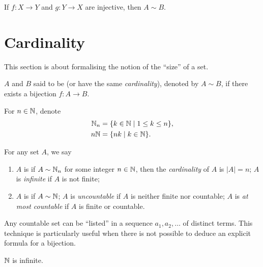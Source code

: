 \begin{theorem}
If $f:X\to Y$ and $g:Y\to X$ are injective, then $A\sim B$.
\end{theorem}
\pagebreak

\section{Cardinality}
This section is about formalising the notion of the ``size'' of a set.

\begin{definition}
$A$ and $B$ said to be  (or have the same \emph{cardinality}), denoted by $A\sim B$, if there exists a bijection $f:A\to B$. 
\end{definition}

\begin{notation}
For $n\in\mathbb N$, denote
\begin{align*}
\mathbb N_n&=\{k\in\mathbb N\mid 1\le k\le n\},\\
n\mathbb N&=\{nk\mid k\in\mathbb N\}.
\end{align*}
\end{notation}

\begin{definition}
For any set $A$, we say
\begin{enumerate}[label=(\roman*)]
\item $A$ is  if $A\sim\mathbb N_n$ for some integer $n\in\mathbb N$, then the \emph{cardinality} of $A$ is $|A|=n$; $A$ is \emph{infinite} if $A$ is not finite;
\item $A$ is  if $A\sim \mathbb N$; $A$ is \emph{uncountable} if $A$ is neither finite nor countable; $A$ is \emph{at most countable} if $A$ is finite or countable.
\end{enumerate}
\end{definition}

\begin{remark}
Any countable set can be ``listed'' in a sequence $a_1,a_2,\dots$ of distinct terms. This technique is particularly useful when there is not possible to deduce an explicit formula for a bijection.
\end{remark}

\begin{proposition}
$\mathbb N$ is infinite.
\end{proposition}

